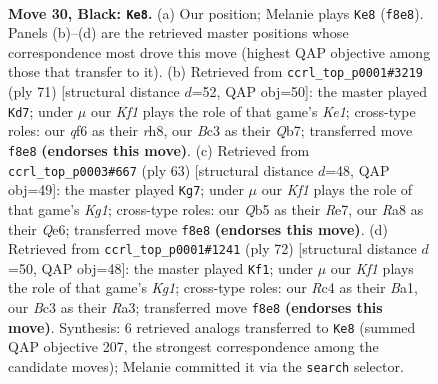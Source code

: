 \documentclass[11pt]{article}
\begin{document}
\clearpage

\begin{figure}[p]\centering
\begin{subfigure}{0.46\textwidth}\centering
\resizebox{\linewidth}{!}{%
\newchessgame
\chessboard[
  setfen={r4k2/p7/4pQ2/pq1p4/2rP2P1/2b5/2P5/3K2R1 b - - 2 30},
  showmover=false,
  pgfstyle=straightmove, color=movearrow, markmove={f8-e8}
]}
\caption{}
\end{subfigure}\hfill
\begin{subfigure}{0.46\textwidth}\centering
\resizebox{\linewidth}{!}{%
\newchessgame
\chessboard[
  setfen={1r2k2R/1q3pp1/5b2/4pP2/8/Q7/1PP1B3/1K6 b - - 6 36},
  showmover=false,
  pgfstyle=straightmove, color=movearrow, markmove={e8-d7}
]}
\caption{}
\end{subfigure}
\\[4pt]
\begin{subfigure}{0.46\textwidth}\centering
\resizebox{\linewidth}{!}{%
\newchessgame
\chessboard[
  setfen={3Q2k1/4r2p/p3q1p1/1p6/8/7P/P4PP1/2R3K1 b - - 3 32},
  showmover=false,
  pgfstyle=straightmove, color=movearrow, markmove={g8-g7}
]}
\caption{}
\end{subfigure}\hfill
\begin{subfigure}{0.46\textwidth}\centering
\resizebox{\linewidth}{!}{%
\newchessgame
\chessboard[
  setfen={1r4k1/6pp/5p2/2p5/2P3q1/R3Pb2/3Q3P/B3R1K1 w - - 0 37},
  showmover=false,
  pgfstyle=straightmove, color=movearrow, markmove={g1-f1}
]}
\caption{}
\end{subfigure}
\caption{\textbf{Move 30, Black: \texttt{Ke8}.} (a) Our position; Melanie plays \texttt{Ke8} (\texttt{f8e8}). Panels (b)--(d) are the retrieved master positions whose correspondence most drove this move (highest QAP objective among those that transfer to it). (b) Retrieved from \texttt{ccrl\_top\_p0001\#3219} (ply 71) [structural distance $d$=52, QAP obj=50]: the master played \texttt{Kd7}; under $\mu$ our \emph{Kf1} plays the role of that game's \emph{Ke1}; cross-type roles: our \emph{q}f6 as their \emph{r}h8, our \emph{B}c3 as their \emph{Q}b7; transferred move \texttt{f8e8} \textbf{(endorses this move)}. (c) Retrieved from \texttt{ccrl\_top\_p0003\#667} (ply 63) [structural distance $d$=48, QAP obj=49]: the master played \texttt{Kg7}; under $\mu$ our \emph{Kf1} plays the role of that game's \emph{Kg1}; cross-type roles: our \emph{Q}b5 as their \emph{R}e7, our \emph{R}a8 as their \emph{Q}e6; transferred move \texttt{f8e8} \textbf{(endorses this move)}. (d) Retrieved from \texttt{ccrl\_top\_p0001\#1241} (ply 72) [structural distance $d$=50, QAP obj=48]: the master played \texttt{Kf1}; under $\mu$ our \emph{Kf1} plays the role of that game's \emph{Kg1}; cross-type roles: our \emph{R}c4 as their \emph{B}a1, our \emph{B}c3 as their \emph{R}a3; transferred move \texttt{f8e8} \textbf{(endorses this move)}. Synthesis: 6 retrieved analogs transferred to \texttt{Ke8} (summed QAP objective 207, the strongest correspondence among the candidate moves); Melanie committed it via the \texttt{search} selector.}
\label{fig:thought-m59}
\end{figure}
\end{document}
